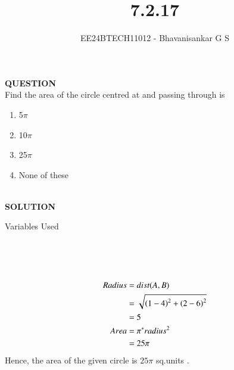 \documentclass[journal]{IEEEtran}
\begin{document}

\vspace{3cm}

\title{7.2.17}
\author{EE24BTECH11012 - Bhavanisankar G S}
{\let\newpage\relax\maketitle}

\renewcommand{\thefigure}{\theenumi}
\renewcommand{\thetable}{\theenumi}
\setlength{\intextsep}{10pt} %


\renewcommand{\thetable}{\theenumi}

\textbf{QUESTION} \\
Find the area of the circle centred at  and passing through  is \\
\begin{enumerate}
    \item 5$\pi$ 
    \item 10$\pi$
    \item 25$\pi$
    \item None of these
\end{enumerate} \\
\textbf{SOLUTION} \\

\begin{table}[h!]
	\centering
        
	\caption{Variables Used}
	\label{tab7.2.17}
\end{table} \\ \\ \\

\begin{align}
	Radius &= dist(A,B) \\
	       &= \sqrt{\left(1-4\right)^2 + \left(2-6\right)^2} \\
	       &= 5 \\
	Area   &= \pi^*radius^2 \\ 
	       &= 25\pi \\
\end{align}
Hence, the area of the given circle is $ 25\pi $ sq.units .
	
\end{document}
